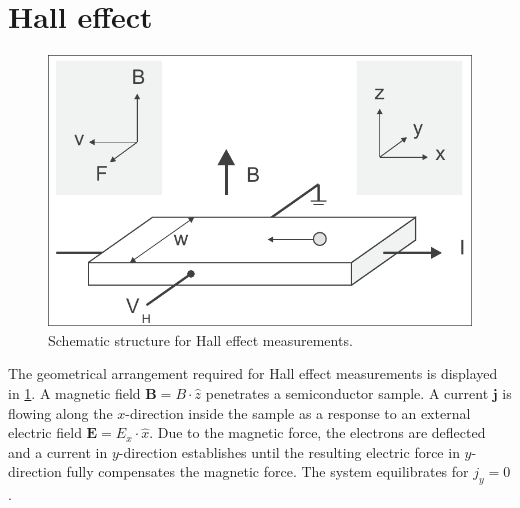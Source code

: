 \section{Hall effect}
\begin{figure}
	\centering
	\includegraphics[width=0.8\linewidth]{../assets/hall_geometry.png}
	\caption{Schematic structure for Hall effect measurements.
		}
	\label{fig:hall}
\end{figure}
The geometrical arrangement required for Hall effect measurements
is displayed in \cref{fig:hall}.
A magnetic field $\mathbf{B}=B \cdot \hat{z}$ penetrates
a semiconductor sample.
A current $\mathbf{j}$ is flowing along the $x$-direction inside the sample 
as a response to an external electric field $\mathbf{E}=E_x \cdot \hat{x}$.
Due to the magnetic force, the electrons are deflected and a current in
$y$-direction establishes until the resulting electric force in $y$-direction
fully compensates the magnetic force.
The system equilibrates for $j_y=0$.

